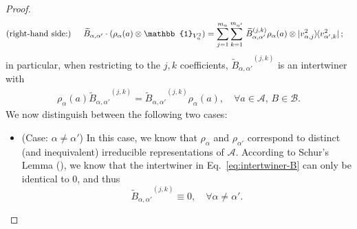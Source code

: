 \documentclass[12pt]{article}
\theoremstyle{plain}
\begin{document}
\begin{proof}
\begin{align*}
\text{(right-hand side:) }  \quad \widetilde{B}_{\alpha,\alpha'} \cdot (\rho_{\alpha}(a) \otimes \mathbb{1}_{V_\alpha^2})&= \sum_{j=1}^{m_\alpha} \sum_{k=1}^{m_{\alpha'}} \,  {\widetilde{B}_{\alpha,\alpha'}}^{(j,k)} \rho_\alpha(a) \otimes \ket{v_{\alpha,j}^2} \hspace{-1mm}\bra{v_{\alpha',k}^2};
\end{align*}
in particular, when restricting to the $j,k$ coefficients, ${\widetilde{B}_{\alpha,\alpha'}}^{(j,k)}$ is an intertwiner with
\begin{align}\label{eq:intertwiner-B}
\rho_\alpha(a) {\widetilde{B}_{\alpha,\alpha'}}^{(j,k)}  = {\widetilde{B}_{\alpha,\alpha'}}^{(j,k)} \rho_\alpha(a), \quad \forall a \in \mathcal{A}, \, B \in \mathcal{B}.    
\end{align}
We now distinguish between the following two cases:
\begin{itemize}
    \item (Case: $\alpha \neq \alpha'$) In this case, we know that $\rho_{\alpha}$ and $\rho_{\alpha'}$ correspond to distinct (and inequivalent) irreducible representations of $\mathcal{A}$. According to Schur's Lemma (), we know that the intertwiner in Eq.~\eqref{eq:intertwiner-B} can only be identical to $0$, and thus
    $$
    {\widetilde{B}_{\alpha,\alpha'}}^{(j,k)} \equiv 0, \quad \forall \alpha \neq \alpha'.
    $$


\end{itemize}
\end{proof}
\end{document}
